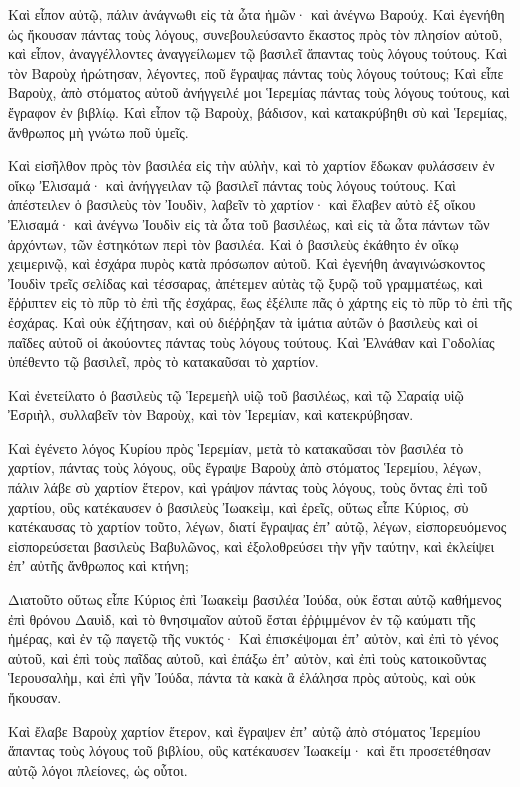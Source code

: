{Καὶ εἶπον αὐτῷ, πάλιν ἀνάγνωθι εἰς τὰ ὦτα ἡμῶν· καὶ ἀνέγνω Βαρούχ.
Καὶ ἐγενήθη ὡς ἤκουσαν πάντας τοὺς λόγους, συνεβουλεύσαντο ἕκαστος πρὸς τὸν πλησίον αὐτοῦ, καὶ εἶπον, ἀναγγέλλοντες ἀναγγείλωμεν τῷ βασιλεῖ ἅπαντας τοὺς λόγους τούτους.
Καὶ τὸν Βαροὺχ ἠρώτησαν, λέγοντες, ποῦ ἔγραψας πάντας τοὺς λόγους τούτους;
Καὶ εἶπε Βαροὺχ, ἀπὸ στόματος αὐτοῦ ἀνήγγειλέ μοι Ἱερεμίας πάντας τοὺς λόγους τούτους, καὶ ἔγραφον ἐν βιβλίῳ.
Καὶ εἶπον τῷ Βαροὺχ, βάδισον, καὶ κατακρύβηθι σὺ καὶ Ἱερεμίας, ἄνθρωπος μὴ γνώτω ποῦ ὑμεῖς.
\par }{\PP {}Καὶ εἰσῆλθον πρὸς τὸν βασιλέα εἰς τὴν αὐλὴν, καὶ τὸ χαρτίον ἔδωκαν φυλάσσειν ἐν οἴκῳ Ἐλισαμά· καὶ ἀνήγγειλαν τῷ βασιλεῖ πάντας τοὺς λόγους τούτους.
Καὶ ἀπέστειλεν ὁ βασιλεὺς τὸν Ἰουδὶν, λαβεῖν τὸ χαρτίον· καὶ ἔλαβεν αὐτὸ ἐξ οἴκου Ἐλισαμά· καὶ ἀνέγνω Ἰουδὶν εἰς τὰ ὦτα τοῦ βασιλέως, καὶ εἰς τὰ ὦτα πάντων τῶν ἀρχόντων, τῶν ἑστηκότων περὶ τὸν βασιλέα.
Καὶ ὁ βασιλεὺς ἐκάθητο ἐν οἴκῳ χειμερινῷ, καὶ ἐσχάρα πυρὸς κατὰ πρόσωπον αὐτοῦ.
Καὶ ἐγενήθη ἀναγινώσκοντος Ἰουδὶν τρεῖς σελίδας καὶ τέσσαρας, ἀπέτεμεν αὐτὰς τῷ ξυρῷ τοῦ γραμματέως, καὶ ἔῤῥιπτεν εἰς τὸ πῦρ τὸ ἐπὶ τῆς ἐσχάρας, ἕως ἐξέλιπε πᾶς ὁ χάρτης εἰς τὸ πῦρ τὸ ἐπὶ τῆς ἐσχάρας.
Καὶ οὐκ ἐζήτησαν, καὶ οὐ διέῤῥηξαν τὰ ἱμάτια αὐτῶν ὁ βασιλεὺς καὶ οἱ παῖδες αὐτοῦ οἱ ἀκούοντες πάντας τοὺς λόγους τούτους.
Καὶ Ἐλνάθαν καὶ Γοδολίας ὑπέθεντο τῷ βασιλεῖ, πρὸς τὸ κατακαῦσαι τὸ χαρτίον.
\par }{\PP {}Καὶ ἐνετείλατο ὁ βασιλεὺς τῷ Ἱερεμεὴλ υἱῷ τοῦ βασιλέως, καὶ τῷ Σαραίᾳ υἱῷ Ἐσριὴλ, συλλαβεῖν τὸν Βαροὺχ, καὶ τὸν Ἱερεμίαν, καὶ κατεκρύβησαν.
\par }{\PP {}Καὶ ἐγένετο λόγος Κυρίου πρὸς Ἱερεμίαν, μετὰ τὸ κατακαῦσαι τὸν βασιλέα τὸ χαρτίον, πάντας τοὺς λόγους, οὓς ἔγραψε Βαροὺχ ἀπὸ στόματος Ἱερεμίου, λέγων,
πάλιν λάβε σὺ χαρτίον ἕτερον, καὶ γράψον πάντας τοὺς λόγους, τοὺς ὄντας ἐπὶ τοῦ χαρτίου, οὓς κατέκαυσεν ὁ βασιλεὺς Ἰωακεὶμ,
καὶ ἐρεῖς, οὕτως εἶπε Κύριος, σὺ κατέκαυσας τὸ χαρτίον τοῦτο, λέγων, διατί ἔγραψας ἐπʼ αὐτῷ, λέγων, εἰσπορευόμενος εἰσπορεύσεται βασιλεὺς Βαβυλῶνος, καὶ ἐξολοθρεύσει τὴν γῆν ταύτην, καὶ ἐκλείψει ἐπʼ αὐτῆς ἄνθρωπος καὶ κτήνη;
\par }{\PP {}Διατοῦτο οὕτως εἶπε Κύριος ἐπὶ Ἰωακεὶμ βασιλέα Ἰούδα, οὐκ ἔσται αὐτῷ καθήμενος ἐπὶ θρόνου Δαυὶδ, καὶ τὸ θνησιμαῖον αὐτοῦ ἔσται ἐῤῥιμμένον ἐν τῷ καύματι τῆς ἡμέρας, καὶ ἐν τῷ παγετῷ τῆς νυκτός·
Καὶ ἐπισκέψομαι ἐπʼ αὐτὸν, καὶ ἐπὶ τὸ γένος αὐτοῦ, καὶ ἐπὶ τοὺς παῖδας αὐτοῦ, καὶ ἐπάξω ἐπʼ αὐτὸν, καὶ ἐπὶ τοὺς κατοικοῦντας Ἱερουσαλὴμ, καὶ ἐπὶ γῆν Ἰούδα, πάντα τὰ κακὰ ἃ ἐλάλησα πρὸς αὐτοὺς, καὶ οὐκ ἤκουσαν.
\par }{\PP {}Καὶ ἔλαβε Βαροὺχ χαρτίον ἕτερον, καὶ ἔγραψεν ἐπʼ αὐτῷ ἀπὸ στόματος Ἱερεμίου ἅπαντας τοὺς λόγους τοῦ βιβλίου, οὓς κατέκαυσεν Ἰωακείμ· καὶ ἔτι προσετέθησαν αὐτῷ λόγοι πλείονες, ὡς οὗτοι.

}
